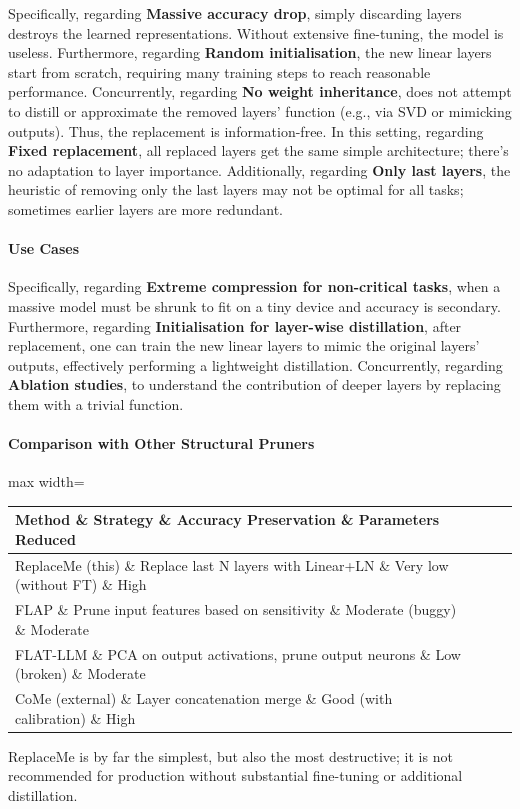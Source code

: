 Specifically, regarding \textbf{Massive accuracy drop}, simply discarding layers destroys the learned representations. Without extensive fine-tuning, the model is useless. Furthermore, regarding \textbf{Random initialisation}, the new linear layers start from scratch, requiring many training steps to reach reasonable performance. Concurrently, regarding \textbf{No weight inheritance}, does not attempt to distill or approximate the removed layers' function (e.g., via SVD or mimicking outputs). Thus, the replacement is information-free. In this setting, regarding \textbf{Fixed replacement}, all replaced layers get the same simple architecture; there's no adaptation to layer importance. Additionally, regarding \textbf{Only last layers}, the heuristic of removing only the last layers may not be optimal for all tasks; sometimes earlier layers are more redundant.


\paragraph{Use Cases}

Specifically, regarding \textbf{Extreme compression for non-critical tasks}, when a massive model must be shrunk to fit on a tiny device and accuracy is secondary. Furthermore, regarding \textbf{Initialisation for layer-wise distillation}, after replacement, one can train the new linear layers to mimic the original layers' outputs, effectively performing a lightweight distillation. Concurrently, regarding \textbf{Ablation studies}, to understand the contribution of deeper layers by replacing them with a trivial function.


\paragraph{Comparison with Other Structural Pruners}

\begin{center}
\begin{adjustbox}{max width=\columnwidth}
\renewcommand{\arraystretch}{1.2}
\begin{tabular}{llll}
\toprule
Method \& Strategy \& Accuracy Preservation \& Parameters Reduced \\
\midrule
ReplaceMe (this) \& Replace last N layers with Linear+LN \& Very low (without FT) \& High \\
FLAP \& Prune input features based on sensitivity \& Moderate (buggy) \& Moderate \\
FLAT-LLM \& PCA on output activations, prune output neurons \& Low (broken) \& Moderate \\
CoMe (external) \& Layer concatenation merge \& Good (with calibration) \& High \\

\bottomrule
\end{tabular}
\end{adjustbox}
\end{center}
ReplaceMe is by far the simplest, but also the most destructive; it is not recommended for production without substantial fine-tuning or additional distillation.



